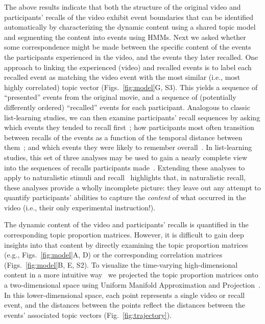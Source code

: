 \documentclass{article}
\newcommand{\corrmats}{S2}
\newcommand{\matchmats}{S3}
\newcommand{\listlearning}{S5}
\begin{document}
The above results indicate that both the structure of the original video and participants' recalls of the video exhibit event boundaries that can be identified automatically by characterizing the dynamic content using a shared topic model and segmenting the content into events using HMMs.  Next we asked whether some correspondence might be made between the specific content of the events the participants experienced in the video, and the events they later recalled.  One approach to linking the experienced (video) and recalled events is to label each recalled event as matching the video event with the most similar (i.e., most highly correlated) topic vector (Figs.~\ref{fig:model}G, \matchmats).  This yields a sequence of ``presented'' events from the original movie, and a sequence of (potentially differently ordered) ``recalled'' events for each participant.  Analogous to classic list-learning studies, we can then examine participants' recall sequences by asking which events they tended to recall first~\citep[e.g., probability of first recall; Fig.~\listlearning A; ][]{WelcBurn24, PostPhil65, AtkiShif68}; how participants most often transition between recalls of the events as a function of the temporal distance between them~\citep[e.g., lag-conditional response probability; Fig.~\listlearning B; ][]{Kaha96}; and which events they were likely to remember overall~\citep[e.g., serial position recall analyses; Fig.~\listlearning C; ][]{Murd62a}.  In list-learning studies, this set of three analyses may be used to gain a nearly complete view into the sequences of recalls participants made~\citep[e.g., ][]{Kaha12}.  Extending these analyses to apply to naturalistic stimuli and recall~\citep{HeusEtal17b} highlights that, in naturalistic recall, these analyses provide a wholly incomplete picture: they leave out any attempt to quantify participants' abilities to capture the \textit{content} of what occurred in the video (i.e., their only experimental instruction!).

The dynamic content of the video and participants' recalls is quantified in the corresponding topic proportion matrices.  However, it is difficult to gain deep insights into that content by directly examining the topic proportion matrices (e.g., Figs.~\ref{fig:model}A, D) or the corresponding correlation matrices (Figs.~\ref{fig:model}B, E, \corrmats).  To visualize the time-varying high-dimensional content in a more intuitive way~\citep{HeusEtal18} we projected the topic proportion matrices onto a two-dimensional space using Uniform Manifold Approximation and Projection~\citep[UMAP; ][]{McInHeal18}.  In this lower-dimensional space, each point represents a single video or recall event, and the distances between the points reflect the distances between the events' associated topic vectors (Fig.~\ref{fig:trajectory}).
\end{document}
